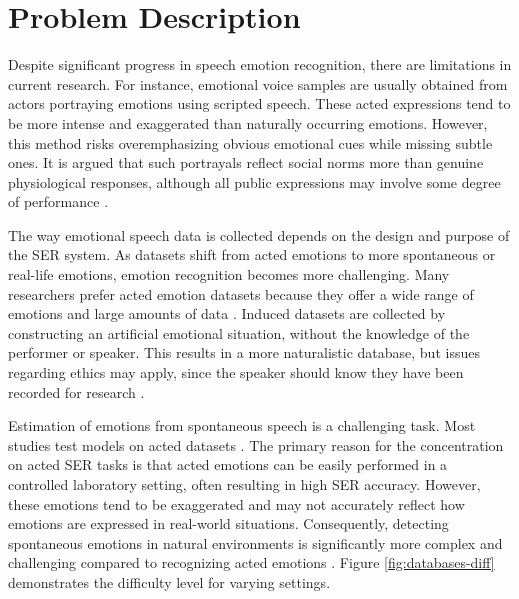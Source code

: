 \section{Problem Description}
Despite significant progress in speech emotion recognition, there are limitations in current research. For instance, emotional voice samples are usually obtained from actors portraying emotions using scripted speech. These acted expressions tend to be more intense and exaggerated than naturally occurring emotions. However, this method risks overemphasizing obvious emotional cues while missing subtle ones. It is argued that such portrayals reflect social norms more than genuine physiological responses, although all public expressions may involve some degree of performance \autocite{Scherer2018}.

The way emotional speech data is collected depends on the design and purpose of the SER system. As datasets shift from acted emotions to more spontaneous or real-life emotions, emotion recognition becomes more challenging. Many researchers prefer acted emotion datasets because they offer a wide range of emotions and large amounts of data \autocite{Rathi2024}. Induced datasets are collected by constructing an artificial emotional situation, without the knowledge of the performer or speaker. This results in a more naturalistic database, but issues regarding ethics may apply, since the speaker should know they have been recorded for research \autocite{Khalil2019}. 

Estimation of emotions from spontaneous speech is a challenging task. Most studies test models on acted datasets \autocite{Khalil2019, Ahammed2024, Praseetha2022, Alroobaea2024}. The primary reason for the concentration on acted SER tasks is that acted emotions can be easily performed in a controlled laboratory setting, often resulting in high SER accuracy. However, these emotions tend to be exaggerated and may not accurately reflect how emotions are expressed in real-world situations. Consequently, detecting spontaneous emotions in natural environments is significantly more complex and challenging compared to recognizing acted emotions \autocite{Zhang2021}. Figure \ref{fig:databases-diff} demonstrates the difficulty level for varying settings.

